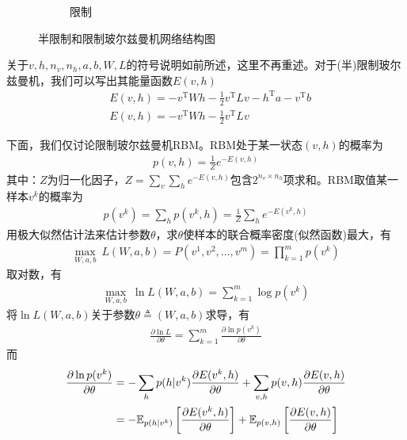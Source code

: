 {\begin{figure}[H]
\begin{subfigure}[b]{0.4\textwidth}
        \caption{限制}
        \label{fig:限制}
    \end{subfigure}
    \caption{半限制和限制玻尔兹曼机网络结构图}
    \label{fig:半限制和限制玻尔兹曼机网络结构图}
\end{figure}
            关于$v,h,n_v,n_h,a,b,W,L$的符号说明如前所述，这里不再重述。对于(半)限制玻尔兹曼机，我们可以写出其能量函数$E(v,h)$
            \begin{align*}
            & E(v,h) = -v^\mathrm{T}Wh - \frac{1}{2} v^\mathrm{T}Lv - h^\mathrm{T}a - v^\mathrm{T}b\\
            & E(v,h) = -v^\mathrm{T}Wh - \frac{1}{2} v^\mathrm{T}Lv
            \end{align*}
            \par
            下面，我们仅讨论限制玻尔兹曼机RBM。RBM处于某一状态$(v,h)$的概率为
            \begin{align*}
            p(v,h) = \frac{1}{Z} e^{-E(v,h)}
            \end{align*}
            其中：$Z$为归一化因子，$Z = \sum_v\sum_he^{-E(v,h)}$包含$2^{n_v\times n_h}$项求和。RBM取值某一样本$v^k$的概率为
            \begin{align*}
            p(v^k) = \sum_h p(v^k,h) = \frac{1}{Z}\sum_he^{-E(v^k,h)}
            \end{align*}
            用极大似然估计法来估计参数$\theta$，求$\theta$使样本的联合概率密度(似然函数)最大，有
            \begin{align*}
            \max_{W,a,b} \ L(W,a,b) = P(v^1,v^2,\dots,v^m) = \prod_{k=1}^mp(v^k)
            \end{align*}
            取对数，有
            \begin{align*}
            \max_{W,a,b} \ \ln L(W,a,b) = \sum_{k=1}^m \log p(v^k)
            \end{align*}
            将$\ln L(W,a,b)$关于参数$\theta\triangleq (W,a,b)$求导，有
            \begin{align*}
            \frac{\partial \ln L}{\partial \theta} = \sum_{k=1}^m \frac{\partial \ln p(v^k)}{\partial \theta}
            \end{align*}
            而
            \begin{align}
            \label{RBM极大似然求导}
            \frac{\partial \ln p(v^k)}{\partial \theta} & = -\sum_h p(h|v^k )\frac{\partial E(v^k,h)}{\partial \theta} + \sum_{v,h}p(v,h)\frac{\partial E(v,h)}{\partial \theta} \\
             & = - \mathbb{E}_{p(h|v^k)} \left[ \frac{\partial E(v^k,h)}{\partial\theta}  \right] + \mathbb{ E}_{p(v,h)} \left[ \frac{\partial E(v,h)}{\partial \theta}  \right] \notag

\end{align}}
